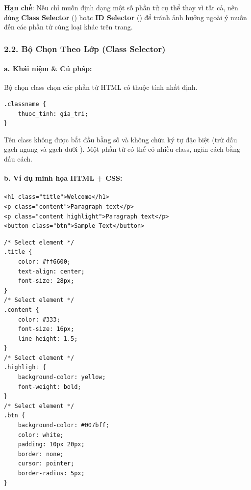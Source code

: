 \begin{warnBox}
\textbf{Hạn chế}: Nếu chỉ muốn định dạng một số phần tử cụ thể thay vì tất cả, nên dùng \textbf{Class Selector} () hoặc \textbf{ID Selector} () để tránh ảnh hưởng ngoài ý muốn đến các phần tử cùng loại khác trên trang.
\end{warnBox}

\subsubsection{2.2. Bộ Chọn Theo Lớp (Class Selector)}

\paragraph{a. Khái niệm \& Cú pháp:}
Bộ chọn class chọn các phần tử HTML có thuộc tính  nhất định.
\begin{codeWindow}
\begin{lstlisting}[language=CSS3]
.classname {
    thuoc_tinh: gia_tri;
}
\end{lstlisting}
\end{codeWindow}
\begin{noteBox}
Tên class không được bắt đầu bằng số và không chứa ký tự đặc biệt (trừ dấu gạch ngang \codeinline{-} và gạch dưới \codeinline{\_}). Một phần tử có thể có nhiều class, ngăn cách bằng dấu cách.
\end{noteBox}

\paragraph{b. Ví dụ minh họa HTML + CSS:}
\begin{codeWindow}
\begin{lstlisting}[language=HTML5]
<h1 class="title">Welcome</h1>
<p class="content">Paragraph text</p>
<p class="content highlight">Paragraph text</p>
<button class="btn">Sample Text</button>
\end{lstlisting}

\begin{lstlisting}[language=CSS3]
/* Select element */
.title {
    color: #ff6600;
    text-align: center;
    font-size: 28px;
}
/* Select element */
.content {
    color: #333;
    font-size: 16px;
    line-height: 1.5;
}
/* Select element */
.highlight {
    background-color: yellow;
    font-weight: bold;
}
/* Select element */
.btn {
    background-color: #007bff;
    color: white;
    padding: 10px 20px;
    border: none;
    cursor: pointer;
    border-radius: 5px;
}
\end{lstlisting}
\end{codeWindow}

